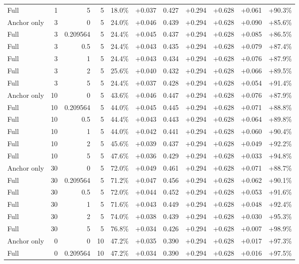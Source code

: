 \begin{table}[htbp]
\begin{tabular}{lrrrccccccc}
Full & 1 & 5 & 5 & 18.0\% & +0.037 & 0.427 & +0.294 & +0.628 & +0.061 & +90.3\% \\
Anchor only & 3 & 0 & 5 & 24.0\% & +0.046 & 0.439 & +0.294 & +0.628 & +0.090 & +85.6\% \\
Full & 3 & 0.209564 & 5 & 24.4\% & +0.045 & 0.437 & +0.294 & +0.628 & +0.085 & +86.5\% \\
Full & 3 & 0.5 & 5 & 24.4\% & +0.043 & 0.435 & +0.294 & +0.628 & +0.079 & +87.4\% \\
Full & 3 & 1 & 5 & 24.4\% & +0.043 & 0.434 & +0.294 & +0.628 & +0.076 & +87.9\% \\
Full & 3 & 2 & 5 & 25.6\% & +0.040 & 0.432 & +0.294 & +0.628 & +0.066 & +89.5\% \\
Full & 3 & 5 & 5 & 24.4\% & +0.037 & 0.428 & +0.294 & +0.628 & +0.054 & +91.4\% \\
Anchor only & 10 & 0 & 5 & 43.6\% & +0.046 & 0.447 & +0.294 & +0.628 & +0.076 & +87.9\% \\
Full & 10 & 0.209564 & 5 & 44.0\% & +0.045 & 0.445 & +0.294 & +0.628 & +0.071 & +88.8\% \\
Full & 10 & 0.5 & 5 & 44.4\% & +0.043 & 0.443 & +0.294 & +0.628 & +0.064 & +89.8\% \\
Full & 10 & 1 & 5 & 44.0\% & +0.042 & 0.441 & +0.294 & +0.628 & +0.060 & +90.4\% \\
Full & 10 & 2 & 5 & 45.6\% & +0.039 & 0.437 & +0.294 & +0.628 & +0.049 & +92.2\% \\
Full & 10 & 5 & 5 & 47.6\% & +0.036 & 0.429 & +0.294 & +0.628 & +0.033 & +94.8\% \\
Anchor only & 30 & 0 & 5 & 72.0\% & +0.049 & 0.461 & +0.294 & +0.628 & +0.071 & +88.7\% \\
Full & 30 & 0.209564 & 5 & 71.2\% & +0.047 & 0.456 & +0.294 & +0.628 & +0.062 & +90.1\% \\
Full & 30 & 0.5 & 5 & 72.0\% & +0.044 & 0.452 & +0.294 & +0.628 & +0.053 & +91.6\% \\
Full & 30 & 1 & 5 & 71.6\% & +0.043 & 0.449 & +0.294 & +0.628 & +0.048 & +92.4\% \\
Full & 30 & 2 & 5 & 74.0\% & +0.038 & 0.439 & +0.294 & +0.628 & +0.030 & +95.3\% \\
Full & 30 & 5 & 5 & 76.8\% & +0.034 & 0.426 & +0.294 & +0.628 & +0.007 & +98.9\% \\
Anchor only & 0 & 0 & 10 & 47.2\% & +0.035 & 0.390 & +0.294 & +0.628 & +0.017 & +97.3\% \\
Full & 0 & 0.209564 & 10 & 47.2\% & +0.034 & 0.390 & +0.294 & +0.628 & +0.016 & +97.5\% \\

\end{tabular}
\end{table}
